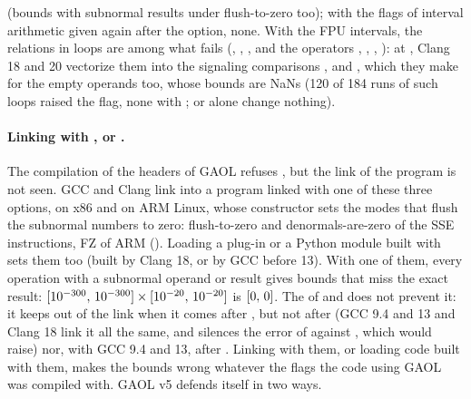 \begin{itemize}
  (bounds with subnormal results under flush-to-zero too); with the flags of
  interval arithmetic given again after the option, none. With the FPU
  intervals, the relations in loops are among what fails
  (, , ,
   and the operators \code{<}, \code{<=}, \code{>},
  \code{>=}): at , Clang 18 and 20 vectorize them
  into the signaling comparisons ,  and
  , which they make for the empty operands too, whose bounds
  are NaNs (120 of 184 runs of such loops raised the flag, none with
  ;  or
   alone change nothing).
\end{itemize}

\paragraph{Linking with ,  or
.}
%
The compilation of the headers of GAOL refuses , but the
link of the program is not seen. GCC and Clang link  into
a program linked with one of these three options, on x86 and on ARM Linux,
whose constructor sets the modes that flush the subnormal numbers to zero:
flush-to-zero and denormals-are-zero of the SSE instructions, FZ of ARM
(). Loading a plug-in or a Python module built with
 sets them too (built by Clang 18, or by GCC before 13). With
one of them, every operation with a subnormal operand or result gives bounds
that miss the exact result: $[10^{-300},\,10^{-300}] \times
[10^{-20},\,10^{-20}]$ is $[0,\,0]$. The  of
 and  does not prevent it: it keeps
 out of the link when it comes after ,
but not after  (GCC 9.4 and 13 and Clang 18 link it all the
same, and  silences the error of
 against , which 
would raise) nor, with GCC 9.4 and 13, after
. Linking with them, or loading code built
with them, makes the bounds wrong whatever the flags the code using GAOL was
compiled with. GAOL v5 defends itself in two ways.\newinvfive

